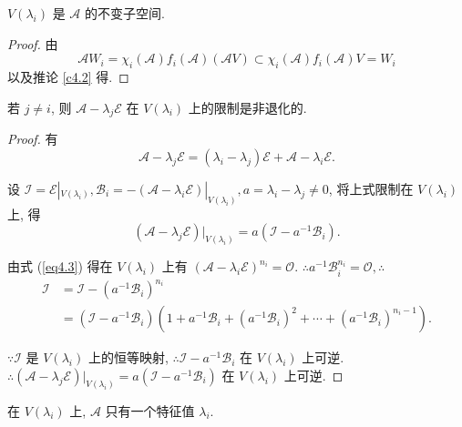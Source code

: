 \documentclass{ctexart}
\begin{document}
\begin{corollary}
    $V(\lambda_i)$ 是 $\mathcal{A}$ 的不变子空间.
\end{corollary}
\begin{proof}
    由
    \[\mathcal{A}W_i=\chi_i(\mathcal{A})f_i(\mathcal{A})(\mathcal{A}V)\subset\chi_i(\mathcal{A})f_i(\mathcal{A})V=W_i\]
    以及推论 \ref{c4.2} 得.
\end{proof}
\begin{corollary}\label{c4.4}
    若 $j\neq i$, 则 $\mathcal{A}-\lambda_j\mathcal{E}$ 在 $V(\lambda_i)$ 上的限制是非退化的.
\end{corollary}
\begin{proof}
    有
    \[\mathcal{A}-\lambda_j\mathcal{E}=(\lambda_i-\lambda_j)\mathcal{E}+\mathcal{A}-\lambda_i\mathcal{E}.\]

    设 $\mathcal{I}=\mathcal{E}|_{V(\lambda_i)},\mathcal{B}_i=-(\mathcal{A}-\lambda_i\mathcal{E})|_{V(\lambda_i)},a=\lambda_i-\lambda_j\neq0$, 将上式限制在 $V(\lambda_i)$ 上, 得
    \[(\mathcal{A}-\lambda_j\mathcal{E})|_{V(\lambda_i)}=a(\mathcal{I}-a^{-1}\mathcal{B}_i).\]

    由式 (\ref{eq4.3}) 得在 $V(\lambda_i)$ 上有 $(\mathcal{A}-\lambda_i\mathcal{E})^{n_i}=\mathcal{O}$. $\therefore a^{-1}\mathcal{B}_i^{n_i}=\mathcal{O},\therefore$
    \begin{align*}
        \mathcal{I} & =\mathcal{I}-(a^{-1}\mathcal{B}_i)^{n_i} \\
        & =(\mathcal{I}-a^{-1}\mathcal{B}_i)(1+a^{-1}\mathcal{B}_i+(a^{-1}\mathcal{B}_i)^2+\cdots+(a^{-1}\mathcal{B}_i)^{n_i-1}).
    \end{align*}

    $\because\mathcal{I}$ 是 $V(\lambda_i)$ 上的恒等映射, $\therefore\mathcal{I}-a^{-1}\mathcal{B}_i$ 在 $V(\lambda_i)$ 上可逆. $\therefore(\mathcal{A}-\lambda_j\mathcal{E})|_{V(\lambda_i)}=a(\mathcal{I}-a^{-1}\mathcal{B}_i)$ 在 $V(\lambda_i)$ 上可逆.
\end{proof}
\begin{corollary}
    在 $V(\lambda_i)$ 上, $\mathcal{A}$ 只有一个特征值 $\lambda_i$.
\end{corollary}
\end{document}
